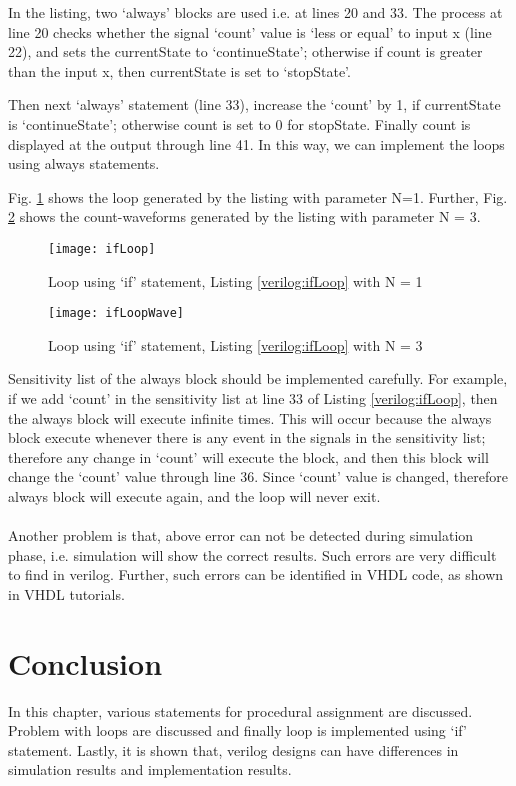 \begin{explanation}
	In the listing, two `always' blocks are used i.e. at lines 20 and 33. The process at line 20 checks whether the signal `count' value is `less or equal' to input x (line 22), and sets the currentState to `continueState'; otherwise if count is greater than the input x, then currentState is set to `stopState'.
	
	Then next `always' statement (line 33), increase the `count' by 1, if currentState is `continueState'; otherwise count is set to 0 for stopState. Finally count is displayed at the output through line 41. In this way, we can implement the loops using always statements. 
	
	Fig. \ref{fig:ifLoop} shows the loop generated by the listing with parameter N=1. Further,  Fig. \ref{fig:ifLoopWave} shows the count-waveforms generated by the listing with parameter N = 3.
\end{explanation}
%

\begin{figure}[!h]
	\centering
	\texttt{[image: ifLoop]}
	\caption{Loop using `if' statement, Listing \ref{verilog:ifLoop} with N = 1}
	\label{fig:ifLoop}
\end{figure}

\begin{figure}[!h]
	\centering
	\texttt{[image: ifLoopWave]}
	\caption{Loop using `if' statement, Listing \ref{verilog:ifLoop} with N = 3}
	\label{fig:ifLoopWave}
\end{figure}
%
\begin{noNumBox}
	Sensitivity list of the always block should be implemented carefully. For example, if we add `count' in the sensitivity list at line 33 of Listing  \ref{verilog:ifLoop}, then the always block will execute infinite times. This will occur because the always block execute whenever there is any event in the signals in the sensitivity list; therefore any change in `count' will execute the block, and then this block will change the `count' value through line 36. Since `count' value is changed, therefore always block will execute again, and the loop will never exit.  
	\\ \\
	Another problem is that,  above error can not be detected during simulation phase, i.e. simulation will show the correct results. Such errors are very difficult to find in verilog. Further, such errors can be identified in VHDL code, as shown in VHDL tutorials.  
\end{noNumBox}
%
\section{Conclusion}
In this chapter, various statements for procedural assignment are discussed. Problem with loops are discussed and finally loop is implemented using `if' statement. Lastly, it is shown that, verilog designs can have differences in simulation results and implementation results. 

